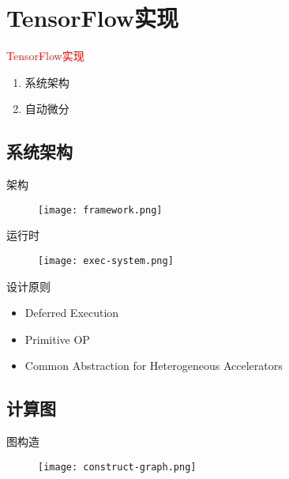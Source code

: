 \section{TensorFlow实现}
\label{sec:architecture}

\begin{frame}
  \begin{center}
    \Huge{\textcolor{red}{TensorFlow实现}}
  \end{center}

  \begin{enumerate}
    \item \alert{系统架构}
    \item \alert{自动微分}
  \end{enumerate}    
\end{frame}

\subsection{系统架构}

\begin{frame}{架构}
  \begin{figure}
    \centering
    \texttt{[image: framework.png]}
  \end{figure}
\end{frame}

\begin{frame}{运行时}
  \begin{figure}
    \centering
    \texttt{[image: exec-system.png]}
  \end{figure}
\end{frame}

\begin{frame}{设计原则}
    \begin{itemize}
      \item \alert{Deferred Execution}
      \item \alert{Primitive OP}
      \item \alert{Common Abstraction for Heterogeneous Accelerators}
    \end{itemize}
\end{frame}

\subsection{计算图}

\begin{frame}{图构造}
  \begin{figure}
    \centering
    \texttt{[image: construct-graph.png]}
  \end{figure}
\end{frame}

